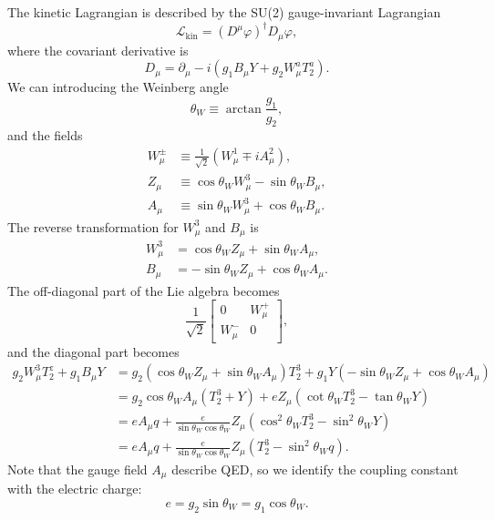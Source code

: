 The kinetic Lagrangian is described by the SU(2) gauge-invariant Lagrangian
\begin{equation}
	\mathcal L_{\mathrm{kin}} = (D^\mu \varphi)^\dagger D_\mu \varphi,
\end{equation}
where the covariant derivative is
\begin{equation}
	D_\mu = \partial_\mu -i \left(g_1 B_\mu Y + g_2 W^a_\mu T_2^a\right).
\end{equation}
We can introducing the Weinberg angle
\begin{equation}
	\theta_W \equiv\arctan \frac{g_1}{g_2},
\end{equation}
and the fields
\begin{equation}
\begin{aligned}
	W_\mu^\pm &\equiv \frac{1}{\sqrt 2}(W^1_\mu \mp i A_\mu^2), \\
	Z_\mu &\equiv \cos{\theta_W} W^3_\mu - \sin{\theta_W} B_\mu, \\
	A_\mu &\equiv \sin{\theta_W} W_\mu^3 + \cos{\theta_W} B_\mu.
\end{aligned}
\end{equation}
The reverse transformation for $W_\mu^3$ and $B_\mu$ is
\begin{equation}
\begin{aligned}
	W_\mu^3 &= \cos{\theta_W} Z_\mu + \sin{\theta_W} A_\mu, \\
	B_\mu &= -\sin{\theta_W} Z_\mu +\cos{\theta_W} A_\mu.
\end{aligned}
\end{equation}
The off-diagonal part of the Lie algebra becomes
\begin{equation}
	\frac{1}{\sqrt 2}\begin{bmatrix}
		0 &  W^+_\mu \\
		W_\mu^- & 0
	\end{bmatrix},
\end{equation}
and the diagonal part becomes
\begin{equation}
\begin{aligned}
	g_2 W_\mu^3 T^z_2 + g_1 B_\mu Y
	&= g_2 (\cos{\theta_W} Z_\mu + \sin{\theta_W} A_\mu) T^3_2 + g_1 Y (-\sin{\theta_W} Z_\mu +\cos{\theta_W} A_\mu) \\
	&= g_2 \cos{\theta_W} A_\mu \left(T^3_2 + Y\right) + eZ_\mu \left(\cot{\theta_W}T_2^3 - \tan{\theta_W}Y \right) \\
	&= e A_\mu q + \frac{e}{\sin{\theta_W}\cos{\theta_W}} Z_\mu \left(\cos^2{\theta_W}T_2^3 - \sin^2{\theta_W} Y\right) \\
	&= e A_\mu q + \frac{e}{\sin{\theta_W}\cos{\theta_W}} Z_\mu \left(T_2^3 - \sin^2{\theta_W} q\right).
\end{aligned}
\end{equation}
Note that the gauge field $A_\mu$ describe QED, so we identify the coupling constant with the electric charge:
\begin{equation}
	e = g_2 \sin{\theta_W} = g_1 \cos{\theta_W}.
\end{equation}

